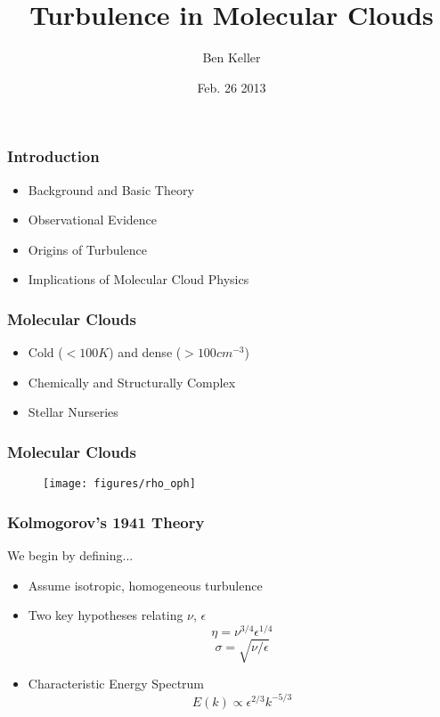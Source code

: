 \documentclass[serif,mathserif]{beamer}
\author{Ben Keller}
\title[Molecular Cloud Turbulence\hspace{2em}\insertframenumber/\inserttotalframenumber]{Turbulence in
Molecular Clouds}
\date{Feb. 26 2013} %
\institute{Physics 785}
\begin{document}
\maketitle


\begin{frame}
  \frametitle{Introduction}
  \begin{itemize}
  \item Background and Basic Theory\pause
  \item Observational Evidence\pause
  \item Origins of Turbulence\pause
  \item Implications of Molecular Cloud Physics
  \end{itemize}
\end{frame}


\begin{frame}
  \frametitle{Molecular Clouds}
  \begin{itemize}
	  \item Cold ($<100K$) and dense ($>100 cm^{-3}$)
	  \item Chemically and Structurally Complex
	  \item Stellar Nurseries
  \end{itemize}
\end{frame}

\begin{frame}
  \frametitle{Molecular Clouds}
  \begin{figure}[t]
	\centering
	\texttt{[image: figures/rho\_oph]}
  \end{figure}
\end{frame}

\begin{frame}
  \frametitle{Kolmogorov's 1941 Theory}
  We begin by defining...
  \begin{itemize}
	  \item Assume isotropic, homogeneous turbulence
  \item Two key hypotheses relating $\nu$, $\epsilon$
    \begin{equation*}
		\eta = \nu^{3/4}\epsilon^{1/4}
    \end{equation*}
    \begin{equation*}
		\sigma = \sqrt{\nu/\epsilon}
    \end{equation*}
  \item Characteristic Energy Spectrum
    \begin{equation*}
		E(k) \propto \epsilon^{2/3}k^{-5/3}
    \end{equation*}
  \end{itemize}
\end{frame}
\end{document}
